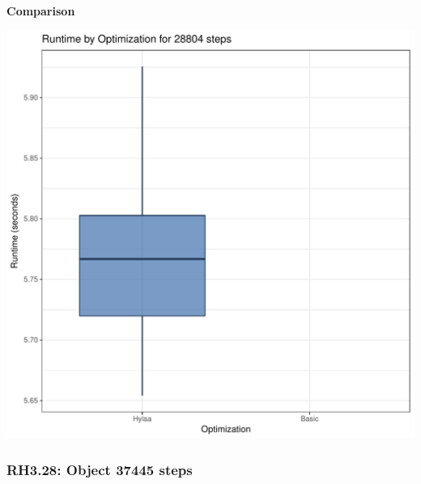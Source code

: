 \documentclass{article}\usepackage[]{graphicx}\usepackage[]{color}
\makeatletter
\def\maxwidth{ %
  \ifdim\Gin@nat@width>\linewidth
    \linewidth
  \else
    \Gin@nat@width
  \fi
}
\newenvironment{knitrout}{}{} %
\makeatother
\begin{document}
 \textbf{Comparison}
  
\begin{knitrout}
\color{fgcolor}
\includegraphics[width=\maxwidth]{figure/RH3_steps28804-1} 

\end{knitrout}


\subsubsection{RH3.28: Object 37445 steps}
\end{document}
